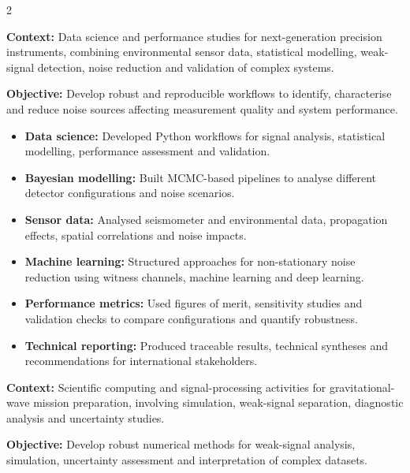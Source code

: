 \documentclass[8pt,a4paper,ragged2e,withhyper]{../_shared/altacv}
\begin{document}
\begin{paracol}{2}

\textbf{Context:} Data science and performance studies for next-generation precision instruments, combining environmental sensor data, statistical modelling, weak-signal detection, noise reduction and validation of complex systems.

\textbf{Objective:} Develop robust and reproducible workflows to identify, characterise and reduce noise sources affecting measurement quality and system performance.

\begin{itemize}
  \item \textbf{Data science:} Developed Python workflows for signal analysis, statistical modelling, performance assessment and validation.
  \item \textbf{Bayesian modelling:} Built MCMC-based pipelines to analyse different detector configurations and noise scenarios.
  \item \textbf{Sensor data:} Analysed seismometer and environmental data, propagation effects, spatial correlations and noise impacts.
  \item \textbf{Machine learning:} Structured approaches for non-stationary noise reduction using witness channels, machine learning and deep learning.
  \item \textbf{Performance metrics:} Used figures of merit, sensitivity studies and validation checks to compare configurations and quantify robustness.
  \item \textbf{Technical reporting:} Produced traceable results, technical syntheses and recommendations for international stakeholders.
\end{itemize}

\divider


\textbf{Context:} Scientific computing and signal-processing activities for gravitational-wave mission preparation, involving simulation, weak-signal separation, diagnostic analysis and uncertainty studies.

\textbf{Objective:} Develop robust numerical methods for weak-signal analysis, simulation, uncertainty assessment and interpretation of complex datasets.


\end{paracol}
\end{document}
